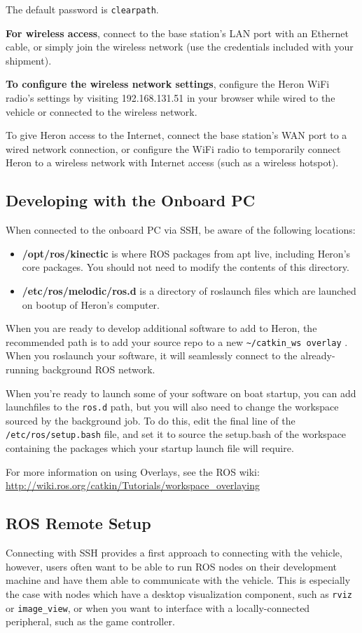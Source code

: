 \documentclass[]{clearpath-latex/clearpath-manual}
\begin{document}
The default password is \lstinline{clearpath}.


\textbf{For wireless access}, connect to the base station’s LAN port with an Ethernet cable, or simply join the wireless network (use the credentials included with your shipment).

\textbf{To configure the wireless network settings}, configure the Heron WiFi radio's settings by visiting 192.168.131.51 in your browser while wired to the vehicle or connected to the wireless network.


To give Heron access to the Internet, connect the base station’s WAN port to a wired network connection, or configure the WiFi radio to temporarily connect Heron to a wireless network with Internet access (such as a wireless hotspot).

\subsection{Developing with the Onboard PC}
When connected to the onboard PC via SSH, be aware of the following locations:

\begin{itemize}[nolistsep]
	\item \textbf{/opt/ros/kinectic} is where ROS packages from apt live, including Heron’s core packages. You should not need to modify the contents of this directory.
	\item \textbf{/etc/ros/melodic/ros.d} is a directory of roslaunch files which are launched on bootup of Heron's computer.
\end{itemize}

When you are ready to develop additional software to add to Heron, the recommended path is to add your source repo to a new \lstinline{~/catkin_ws overlay} . When you roslaunch your software, it will seamlessly connect to the already-running background ROS network.

When you’re ready to launch some of your software on boat startup, you can add launchfiles to the \lstinline{ros.d} path, but you will also need to change the workspace sourced by the background job. To do this, edit the final line of the \lstinline{/etc/ros/setup.bash} file, and set it to source the setup.bash of the workspace containing the packages which your startup launch file will require.

For more information on using Overlays, see the ROS wiki: \url{http://wiki.ros.org/catkin/Tutorials/workspace_overlaying}

\subsection{ROS Remote Setup}
Connecting with SSH provides a first approach to connecting with the vehicle, however, users often want to be able to run ROS nodes on their development machine and have them able to communicate with the vehicle. This is especially the case with nodes which have a desktop visualization component, such as \lstinline{rviz} or \lstinline{image_view}, or when you want to interface with a locally-connected peripheral, such as the game controller.
\end{document}
